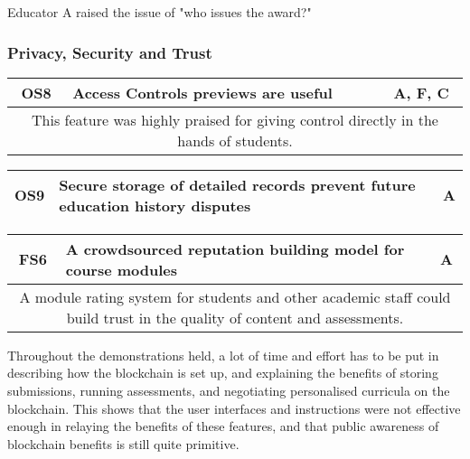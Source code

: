 Educator A raised the issue of "who issues the award?"

\subsubsection{Privacy, Security and Trust}

\begin{table}[!ht]
	\begin{tabularx}{\textwidth}{|c|X|c|}
		\hline
		OS8 & \textbf{Access Controls previews are useful} & A, F, C \\
		\hline
		\multicolumn{3}{|X|}{
			This feature was highly praised for giving control directly in the hands of students.
		}                                                            \\
		\hline
	\end{tabularx}
\end{table}

\begin{table}[!ht]
	\begin{tabularx}{\textwidth}{|c|X|c|}
		\hline
		OS9 & \textbf{Secure storage of detailed records prevent future education history disputes} & A \\
		\hline
	\end{tabularx}
\end{table}

\begin{table}[!ht]
	\begin{tabularx}{\textwidth}{|c|X|c|}
		\hline
		FS6 & \textbf{A crowdsourced reputation building model for course modules} & A \\
		\hline
		\multicolumn{3}{|X|}{
			A module rating system for students and other academic staff could build trust
			in the quality of content and assessments.
		}                                                                              \\
		\hline
	\end{tabularx}
\end{table}

Throughout the demonstrations held, a lot of time and effort has to be put in describing
how the blockchain is set up, and explaining the benefits of storing submissions,
running assessments, and negotiating personalised curricula on the blockchain.
This shows that the user interfaces and instructions were not effective enough in relaying the
benefits of these features, and that public awareness of blockchain benefits is still quite
primitive.


